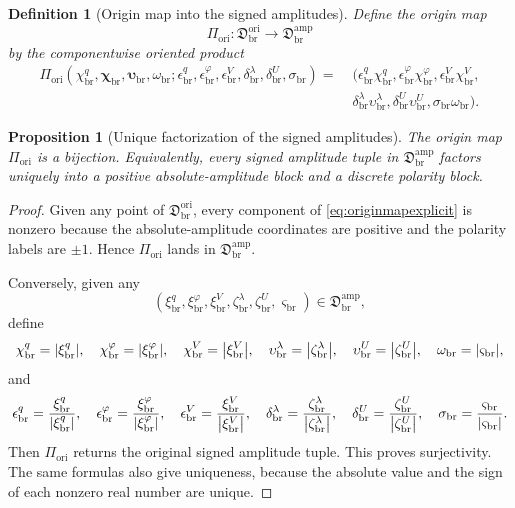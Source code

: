 \documentclass[11pt]{article}
\newcommand{\LiftSector}{\mathfrak D_{\mathrm{br}}^{\mathrm{amp}}}
\newcommand{\DeepReadAmp}{\xi_{\mathrm{br}}^{q}}
\newcommand{\DeepCovAmp}{\xi_{\mathrm{br}}^{\varphi}}
\newcommand{\DeepRelaxAmp}{\xi_{\mathrm{br}}^{V}}
\newcommand{\DeepWellAmp}{\zeta_{\mathrm{br}}^{\lambda}}
\newcommand{\DeepEqAmp}{\zeta_{\mathrm{br}}^{U}}
\newcommand{\DeepScaleAmp}{\varsigma_{\mathrm{br}}}
\newcommand{\OriginSector}{\mathfrak D_{\mathrm{br}}^{\mathrm{ori}}}
\newcommand{\AbsReadAmp}{\chi_{\mathrm{br}}^{q}}
\newcommand{\AbsCovAmp}{\chi_{\mathrm{br}}^{\varphi}}
\newcommand{\AbsRelaxAmp}{\chi_{\mathrm{br}}^{V}}
\newcommand{\AbsKinAmp}{\bm\chi_{\mathrm{br}}}
\newcommand{\AbsWellAmp}{\upsilon_{\mathrm{br}}^{\lambda}}
\newcommand{\AbsEqAmp}{\upsilon_{\mathrm{br}}^{U}}
\newcommand{\AbsAnchorAmp}{\bm\upsilon_{\mathrm{br}}}
\newcommand{\AbsScaleAmp}{\omega_{\mathrm{br}}}
\newcommand{\PolRead}{\epsilon_{\mathrm{br}}^{q}}
\newcommand{\PolCov}{\epsilon_{\mathrm{br}}^{\varphi}}
\newcommand{\PolRelax}{\epsilon_{\mathrm{br}}^{V}}
\newcommand{\PolWell}{\delta_{\mathrm{br}}^{\lambda}}
\newcommand{\PolEq}{\delta_{\mathrm{br}}^{U}}
\newcommand{\PolScale}{\sigma_{\mathrm{br}}}
\newcommand{\OriginMap}{\Pi_{\mathrm{ori}}}
\newtheorem{definition}{Definition}
\newtheorem{proposition}{Proposition}
\begin{document}
\begin{definition}[Origin map into the signed amplitudes]
\label{def:originmap}
Define the origin map
\begin{equation}
\OriginMap:\OriginSector\longrightarrow\LiftSector
\label{eq:originmap}
\end{equation}
by the componentwise oriented product
\begin{align}
\OriginMap(\AbsReadAmp,\AbsKinAmp,\AbsAnchorAmp,\AbsScaleAmp;\PolRead,\PolCov,\PolRelax,\PolWell,\PolEq,\PolScale)
=\;&
(\PolRead\AbsReadAmp,\PolCov\AbsCovAmp,\PolRelax\AbsRelaxAmp,
\nonumber\\
&\PolWell\AbsWellAmp,\PolEq\AbsEqAmp,\PolScale\AbsScaleAmp).
\label{eq:originmapexplicit}
\end{align}
\end{definition}

\begin{proposition}[Unique factorization of the signed amplitudes]
\label{prop:bijection}
The origin map \(\OriginMap\) is a bijection. Equivalently, every signed amplitude tuple in \(\LiftSector\) factors uniquely into a positive absolute-amplitude block and a discrete polarity block.
\end{proposition}

\begin{proof}
Given any point of \(\OriginSector\), every component of \eqref{eq:originmapexplicit} is nonzero because the absolute-amplitude coordinates are positive and the polarity labels are \(\pm1\). Hence \(\OriginMap\) lands in \(\LiftSector\).

Conversely, given any
\[
(\DeepReadAmp,\DeepCovAmp,\DeepRelaxAmp,\DeepWellAmp,\DeepEqAmp,\DeepScaleAmp)\in\LiftSector,
\]
define
\[
\AbsReadAmp=\abs{\DeepReadAmp},
\quad
\AbsCovAmp=\abs{\DeepCovAmp},
\quad
\AbsRelaxAmp=\abs{\DeepRelaxAmp},
\quad
\AbsWellAmp=\abs{\DeepWellAmp},
\quad
\AbsEqAmp=\abs{\DeepEqAmp},
\quad
\AbsScaleAmp=\abs{\DeepScaleAmp},
\]
and
\[
\PolRead=\frac{\DeepReadAmp}{\abs{\DeepReadAmp}},
\quad
\PolCov=\frac{\DeepCovAmp}{\abs{\DeepCovAmp}},
\quad
\PolRelax=\frac{\DeepRelaxAmp}{\abs{\DeepRelaxAmp}},
\quad
\PolWell=\frac{\DeepWellAmp}{\abs{\DeepWellAmp}},
\quad
\PolEq=\frac{\DeepEqAmp}{\abs{\DeepEqAmp}},
\quad
\PolScale=\frac{\DeepScaleAmp}{\abs{\DeepScaleAmp}}.
\]
Then \(\OriginMap\) returns the original signed amplitude tuple. This proves surjectivity. The same formulas also give uniqueness, because the absolute value and the sign of each nonzero real number are unique.
\end{proof}
\end{document}
